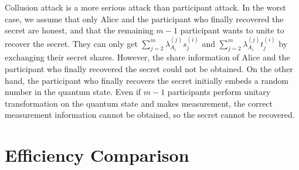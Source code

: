 \documentclass[pdflatex,sn-mathphys]{sn-jnl}%
\theoremstyle{thmstyleone}%
\theoremstyle{thmstyletwo}%
\theoremstyle{thmstylethree}%
\begin{document}
  Collusion attack is a more serious attack than participant attack. In the worst case, we assume that only Alice and the participant who finally recovered the secret are honest, and that the remaining $m-1$ participant wants to unite to recover the secret. They can only get $\sum_{j=2}^{m}\lambda_{A_i}^{(j)}s_j^{(i)}$ 
and $\sum_{j=2}^{m}\lambda_{A_i}^{(j)}t_j^{(i)}$ by exchanging their secret shares. However, the share information of Alice and the participant who finally recovered the secret could not be obtained. On the other hand, the participant who finally recovers the secret initially embeds a random number in the quantum state. Even if $m-1$ participants perform unitary transformation on the quantum state and makes measurement, the correct measurement information cannot be obtained, so the secret cannot be recovered.

\section{Efficiency Comparison}\label{sec6}
\end{document}
